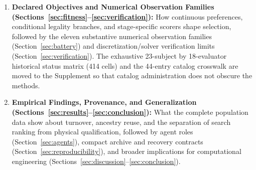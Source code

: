 \begin{enumerate}
\begin{itemize}
    \item \emph{View~III --- Native Quality-Diversity Campaign Snapshots and Full-Population Accession Boundary:} \NativeSummaryRowsCount\ headerless 14-column generation-by-island summary rows across \NativeSummaryFilesCount\ staged  files (reaching generation~\NativeLongestRetainedGen\ in the initial staged subset with zero internal generation gaps), together with the four-worker (--) inventory of 18 native run directories containing \CompletedGenEightHundredRunsCount\ completed generation-800 runs (3,204 summary rows each). We maintain strict archival honesty regarding data custody: the initial compact snapshot seal (, 295 files / 190,807,895 bytes, index ) intentionally excluded the multi-hundred-megabyte  and  tables, and native   events omit the 129 gene/material columns. While 's original table has been independently counted at \CZeroOneRetainedIdsCount\ retained IDs over generations 0--800, that count is never extrapolated to the other nine completed runs; full native genome and score reproducibility from Git rests on the dedicated lossless chunked population accession () rather than on summary rows or  staging flags.
  \end{itemize}
  \item \textbf{Declared Objectives and Numerical Observation Families (Sections~\ref{sec:fitness}--\ref{sec:verification}):} How continuous preferences, conditional legality branches, and stage-specific scorers shape selection, followed by the eleven substantive numerical observation families (Section~\ref{sec:battery}) and discretization/solver verification limits (Section~\ref{sec:verification}). The exhaustive 23-subject by 18-evaluator historical status matrix (414 cells) and the 44-entry catalog crosswalk are moved to the Supplement so that catalog administration does not obscure the methods.
  \item \textbf{Empirical Findings, Provenance, and Generalization (Sections~\ref{sec:results}--\ref{sec:conclusion}):} What the complete population data show about turnover, ancestry reuse, and the separation of search ranking from physical qualification, followed by agent roles (Section~\ref{sec:agents}), compact archive and recovery contracts (Section~\ref{sec:reproducibility}), and broader implications for computational engineering (Sections~\ref{sec:discussion}--\ref{sec:conclusion}).
\end{enumerate}

